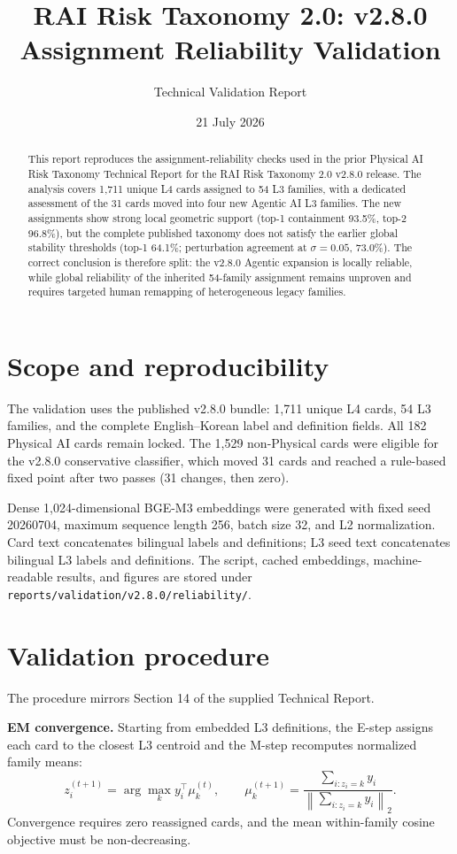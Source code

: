 \documentclass[10pt,a4paper]{article}
\title{\textbf{RAI Risk Taxonomy 2.0: v2.8.0 Assignment Reliability Validation}}
\author{Technical Validation Report}
\date{21 July 2026}
\newcommand{\pct}[1]{#1\%}
\begin{document}
\maketitle

\begin{abstract}
This report reproduces the assignment-reliability checks used in the prior Physical AI Risk Taxonomy Technical Report for the RAI Risk Taxonomy 2.0 v2.8.0 release. The analysis covers 1,711 unique L4 cards assigned to 54 L3 families, with a dedicated assessment of the 31 cards moved into four new Agentic AI L3 families. The new assignments show strong local geometric support (top-1 containment \pct{93.5}, top-2 \pct{96.8}), but the complete published taxonomy does not satisfy the earlier global stability thresholds (top-1 \pct{64.1}; perturbation agreement at $\sigma=0.05$, \pct{73.0}). The correct conclusion is therefore split: the v2.8.0 Agentic expansion is locally reliable, while global reliability of the inherited 54-family assignment remains unproven and requires targeted human remapping of heterogeneous legacy families.
\end{abstract}

\section{Scope and reproducibility}
The validation uses the published v2.8.0 bundle: 1,711 unique L4 cards, 54 L3 families, and the complete English--Korean label and definition fields. All 182 Physical AI cards remain locked. The 1,529 non-Physical cards were eligible for the v2.8.0 conservative classifier, which moved 31 cards and reached a rule-based fixed point after two passes (31 changes, then zero).

Dense 1,024-dimensional BGE-M3 embeddings were generated with fixed seed 20260704, maximum sequence length 256, batch size 32, and L2 normalization. Card text concatenates bilingual labels and definitions; L3 seed text concatenates bilingual L3 labels and definitions. The script, cached embeddings, machine-readable results, and figures are stored under \texttt{reports/validation/v2.8.0/reliability/}.

\section{Validation procedure}
The procedure mirrors Section 14 of the supplied Technical Report.

\textbf{EM convergence.} Starting from embedded L3 definitions, the E-step assigns each card to the closest L3 centroid and the M-step recomputes normalized family means:
\[
z_i^{(t+1)}=\arg\max_k y_i^\top\mu_k^{(t)},\qquad
\mu_k^{(t+1)}=\frac{\sum_{i:z_i=k}y_i}{\left\|\sum_{i:z_i=k}y_i\right\|_2}.
\]
Convergence requires zero reassigned cards, and the mean within-family cosine objective must be non-decreasing.
\end{document}
